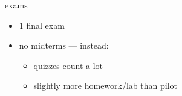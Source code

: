\begin{frame}{exams}
    \begin{itemize}
    \item 1 final exam
    \item no midterms --- instead:
        \begin{itemize}
        \item quizzes count a lot
        \item slightly more homework/lab than pilot
        \end{itemize}
    \end{itemize}
\end{frame}

